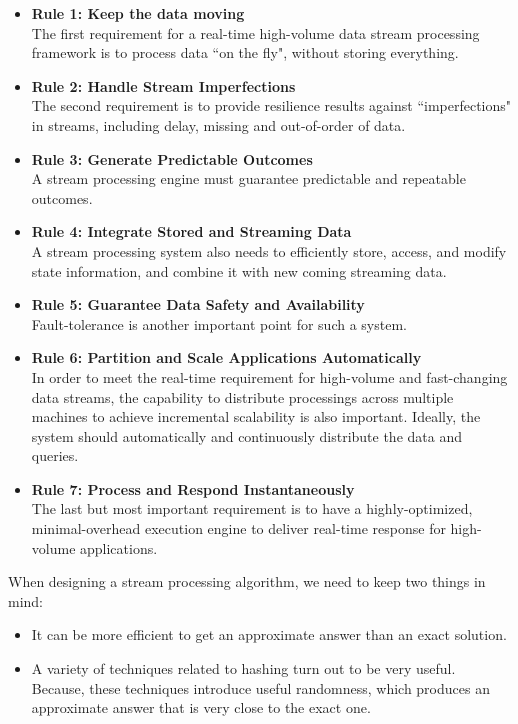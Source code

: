 \documentclass[	DIV=calc,%
							paper=a4,%
							fontsize=11pt,%
							twocolumn]{scrartcl}	 					%
\begin{document}
\begin{itemize}

\item \textbf{Rule 1: Keep the data moving} \\
The first requirement for a real-time high-volume data stream processing framework is to process data ``on the fly", without storing everything. 

\item \textbf{Rule 2: Handle Stream Imperfections}\\
The second requirement is to provide resilience results against ``imperfections" in streams, including delay, missing and out-of-order of data.

\item \textbf{Rule 3: Generate Predictable Outcomes}\\
A stream processing engine must guarantee predictable and repeatable outcomes. 

\item \textbf{Rule 4: Integrate Stored and Streaming Data }\\
A stream processing system also needs to efficiently store, access, and modify state information, and combine it with new coming streaming data. 

\item \textbf{Rule 5: Guarantee Data Safety and Availability}\\
Fault-tolerance is another important point for such a system.

\item \textbf{Rule 6:  Partition and Scale Applications Automatically}\\
In order to meet the real-time requirement for high-volume and fast-changing data streams, the capability to distribute processings across multiple machines to achieve incremental scalability is also important. Ideally, the system should automatically and continuously distribute the data and queries.

\item \textbf{Rule 7: Process and Respond Instantaneously}\\
The last but most important requirement is to have a highly-optimized, minimal-overhead execution engine to deliver real-time response for high-volume applications.
\end{itemize}

When designing a stream processing algorithm, we need to keep two things in mind:

\begin{itemize}

\item It can be more efficient to get an approximate answer than an exact solution.

\item A variety of techniques related to hashing turn out to be very useful. Because, these techniques introduce useful randomness, which produces an approximate answer that is very close to the exact one.

\end{itemize}
\end{document}
